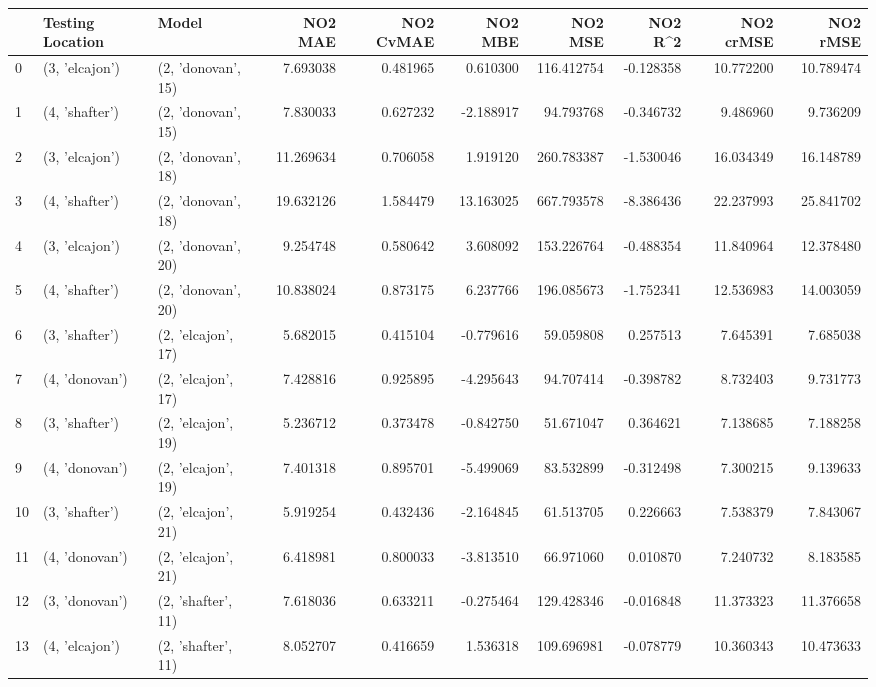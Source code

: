 \begin{tabular}{lllrrrrrrr}
\toprule
{} & Testing Location &               Model &    NO2 MAE &  NO2 CvMAE &    NO2 MBE &     NO2 MSE &   NO2 R\textasciicircum2 &  NO2 crMSE &   NO2 rMSE \\
\midrule
0  &   (3, 'elcajon') &  (2, 'donovan', 15) &   7.693038 &   0.481965 &   0.610300 &  116.412754 & -0.128358 &  10.772200 &  10.789474 \\
1  &   (4, 'shafter') &  (2, 'donovan', 15) &   7.830033 &   0.627232 &  -2.188917 &   94.793768 & -0.346732 &   9.486960 &   9.736209 \\
2  &   (3, 'elcajon') &  (2, 'donovan', 18) &  11.269634 &   0.706058 &   1.919120 &  260.783387 & -1.530046 &  16.034349 &  16.148789 \\
3  &   (4, 'shafter') &  (2, 'donovan', 18) &  19.632126 &   1.584479 &  13.163025 &  667.793578 & -8.386436 &  22.237993 &  25.841702 \\
4  &   (3, 'elcajon') &  (2, 'donovan', 20) &   9.254748 &   0.580642 &   3.608092 &  153.226764 & -0.488354 &  11.840964 &  12.378480 \\
5  &   (4, 'shafter') &  (2, 'donovan', 20) &  10.838024 &   0.873175 &   6.237766 &  196.085673 & -1.752341 &  12.536983 &  14.003059 \\
6  &   (3, 'shafter') &  (2, 'elcajon', 17) &   5.682015 &   0.415104 &  -0.779616 &   59.059808 &  0.257513 &   7.645391 &   7.685038 \\
7  &   (4, 'donovan') &  (2, 'elcajon', 17) &   7.428816 &   0.925895 &  -4.295643 &   94.707414 & -0.398782 &   8.732403 &   9.731773 \\
8  &   (3, 'shafter') &  (2, 'elcajon', 19) &   5.236712 &   0.373478 &  -0.842750 &   51.671047 &  0.364621 &   7.138685 &   7.188258 \\
9  &   (4, 'donovan') &  (2, 'elcajon', 19) &   7.401318 &   0.895701 &  -5.499069 &   83.532899 & -0.312498 &   7.300215 &   9.139633 \\
10 &   (3, 'shafter') &  (2, 'elcajon', 21) &   5.919254 &   0.432436 &  -2.164845 &   61.513705 &  0.226663 &   7.538379 &   7.843067 \\
11 &   (4, 'donovan') &  (2, 'elcajon', 21) &   6.418981 &   0.800033 &  -3.813510 &   66.971060 &  0.010870 &   7.240732 &   8.183585 \\
12 &   (3, 'donovan') &  (2, 'shafter', 11) &   7.618036 &   0.633211 &  -0.275464 &  129.428346 & -0.016848 &  11.373323 &  11.376658 \\
13 &   (4, 'elcajon') &  (2, 'shafter', 11) &   8.052707 &   0.416659 &   1.536318 &  109.696981 & -0.078779 &  10.360343 &  10.473633 \\

\end{tabular}
